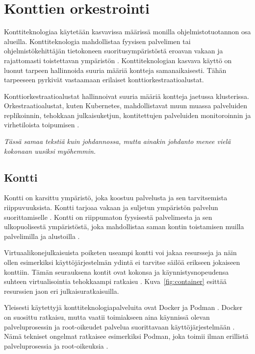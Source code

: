 \chapter{Konttien orkestrointi\label{orchestration}}

Konttiteknologiaa käytetään kasvavissa määrissä monilla ohjelmistotuotannon osa alueilla.
Konttiteknologia mahdollistaa fyysisen palvelimen tai ohjelmistökehittäjän tietokoneen suoritusympäristöstä eroavan vakaan ja rajattomasti toistettavan ympäristön \cite{Watada19}.
Konttiteknologian kasvava käyttö on luonut tarpeen hallinnoida suuria määriä kontteja samanaikaisesti.
Tähän tarpeeseen pyrkivät vastaamaan erilaiset konttiorkestraatioalustat.

Konttiorkestraatioalustat hallinnoivat suuria määriä kontteja jaetussa klusterissa.
Orkestraatioalustat, kuten Kubernetes, mahdollistavat muun muassa palveluiden replikoinnin, tehokkaan julkaisuketjun, kontitettujen palveluiden monitoroinnin ja virhetiloista toipumisen \cite{Khan17}.

\textit{Tässä samaa tekstiä kuin johdannossa, mutta ainakin johdanto menee vielä kokonaan uusiksi myöhemmin.}

\section{Kontti}

Kontti on karsittu ympäristö, joka koostuu palvelusta ja sen tarvitsemista riippuvuuksista.
Kontti tarjoaa vakaan ja suljetun ympäristön palvelun suorittamiselle \cite{Watada19}.
Kontti on riippumaton fyysisestä palvelimesta ja sen ulkopuolisestä ympäristöstä, joka mahdollistaa saman kontin toistamisen muilla palvelimilla ja alustoilla \cite{Saha18}.

Virtuaalikonejulkaisuista poiketen useampi kontti voi jakaa resursseja ja näin ollen esimerkiksi käyttöjärjestelmän ydintä ei tarvitse säilöä erikseen jokaiseen konttiin.
Tämän seurauksena kontit ovat kokonsa ja käynnistysnopeudensa suhteen virtualisointia tehokkaampi ratkaisu \cite{Dua14}.
Kuva~\ref{fig:container} esittää resurssien jaon eri julkaisuratkaisuilla.

Yleisesti käytettyjä konttiteknologiapalveluita ovat Docker ja Podman \cite{Abraham20, Bernstein14}.
Docker on suosittu ratkaisu, mutta vaatii toimiakseen aina käynnissä olevan palveluprosessin ja root-oikeudet palvelua suorittavaan käyttöjärjestelmään \cite{Abraham20}.
Nämä tekniset ongelmat ratkaisee esimerkiksi Podman, joka toimii ilman erillistä palveluprosessia ja root-oikeuksia \cite{Gantikow20}.

